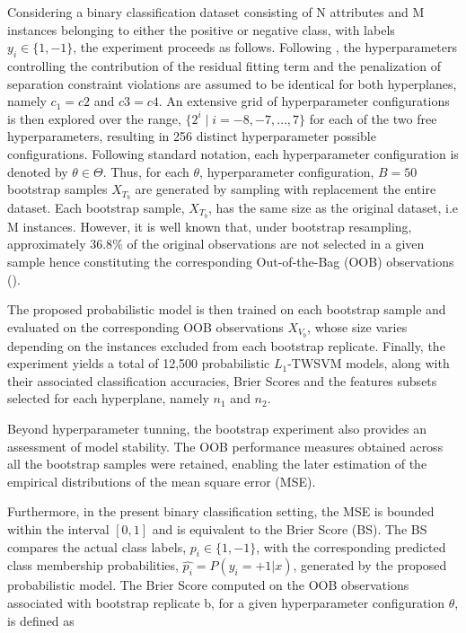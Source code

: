 \documentclass[12pt]{report} %
\begin{document}
Considering a binary classification dataset consisting of N attributes and M instances belonging to either the positive or negative class, with labels $y_i \in \{1,-1\}$, the experiment proceeds as follows. Following \cite{bai2014novel}, the hyperparameters controlling the contribution of the residual fitting term and the penalization of separation constraint violations are assumed to be identical for both hyperplanes, namely $c_1 = c2$ and $c3 = c4$. An extensive grid of hyperparameter configurations is then explored over the range, $\{2^{i} \mid i = -8, -7,\dots, 7\}$ for each of the two free hyperparameters, resulting in 256 distinct hyperparameter possible configurations. Following standard notation, each hyperparameter configuration is denoted by $\theta \in \Theta$. Thus, for each $\theta$, hyperparameter configuration, $B=50$ bootstrap samples $X_{T_b}$ are generated by sampling with replacement the entire dataset. Each bootstrap sample, $X_{T_b}$, has the same size as the original dataset, i.e M instances. However, it is well known that, under bootstrap resampling, approximately $36.8\%$ of the original observations are not selected in a given sample hence constituting the corresponding Out-of-the-Bag (OOB) observations (\cite{chernick2014introduction}). 

\newpage

The proposed probabilistic model is then trained on each bootstrap sample and evaluated on the corresponding OOB observations $X_{V_b}$, whose size varies depending on the instances excluded from each bootstrap replicate. Finally, the experiment yields a total of 12,500 probabilistic $L_1$-TWSVM models, along with their associated classification accuracies, Brier Scores and the features subsets selected for each hyperplane, namely $n_1$ and $n_2$.

Beyond hyperparameter tunning, the bootstrap experiment also provides an assessment of model stability. The OOB performance measures obtained across all the bootstrap samples were retained, enabling the later estimation of the empirical distributions of the mean square error (MSE).

Furthermore, in the present binary classification setting, the MSE is bounded within the interval $[0,1]$ and is equivalent to the Brier Score (BS). The BS compares the actual class labels, $p_i \in \{1, -1\}$, with the corresponding predicted class membership probabilities, $\hat{p_i} = P(y_i = +1| x)$, generated by the proposed probabilistic model. The Brier Score computed on the OOB observations associated with bootstrap replicate b, for a given hyperparameter configuration $\theta$, is defined as
\end{document}
